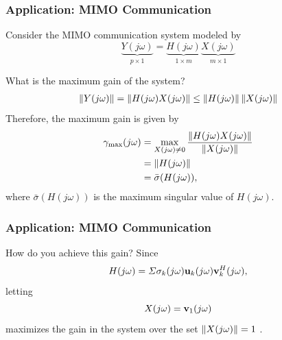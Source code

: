 \documentclass{beamer}
\begin{document}
\begin{frame}\frametitle{Application:  MIMO Communication}
	Consider the MIMO communication system modeled by
	\[ 
		\underbrace{
			Y(j\omega)
		}_{p\times 1} 
		= \underbrace{
			H(j\omega)
		  }_{1\times m}
		  \underbrace{
		  	X(j\omega)
		  }_{m\times 1} 
	\]
	
	\vfill
	
	What is the maximum gain of the system?
	\begin{align*}
		\left\|Y(j\omega)\right\| 
			= \left\|H(j\omega)X(j\omega)\right\| 
			\leq \left\|H(j\omega)\right\|\left\|X(j\omega)\right\| 
	\end{align*}
	Therefore, the maximum gain is given by
	\begin{align*}
		\gamma_{\max}(j\omega) 
			&=  \max_{X(j\omega) \neq 0}
					\frac{\left\|H(j\omega)X(j\omega)\right\|}{\left\|X(j\omega)\right\|} \\
		&= \left\|H(j\omega)\right\|\\
		&= \bar{\sigma}(H(j\omega)),
	\end{align*}
	where $\bar{\sigma}(H(j\omega))$ is the maximum singular value of $H(j\omega)$.
\end{frame}

\begin{frame}\frametitle{Application:  MIMO Communication}
	How do you achieve this gain?
	Since 
	\[
		H(j\omega) 
			= \Sigma \sigma_k(j\omega)\mathbf{u}_k(j\omega)\mathbf{v}_k^H(j\omega),
	\]
	letting
	\[ 
		X(j\omega) = \mathbf{v}_1(j\omega) 
	\]
	maximizes the gain in the system over the set 
	$\left\|X(j\omega) \right\| = 1$	.
\end{frame}
\end{document}
